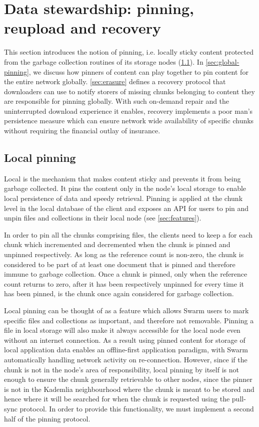 


\section{Data stewardship: pinning, reupload and recovery \statusyellow}\label{sec:reupload}

This section introduces the notion of pinning, i.e. locally sticky content protected from the garbage collection routines of its storage nodes (\ref{sec:pinning}). In \ref{sec:global-pinning}, we discuss how pinners of content can play together to pin content for the entire network globally. \ref{sec:erasure} defines a recovery protocol that downloaders can use to notify storers of missing chunks belonging to content they are responsible for pinning globally. With such on-demand repair and the uninterrupted download experience it enables, recovery implements a poor man's persistence measure which can ensure network wide availability of specific chunks without requiring the financial outlay of insurance.

\subsection{Local pinning \statusgreen}\label{sec:pinning}

Local  is the mechanism that makes content sticky and prevents it from being garbage collected. It pins the content only in the node's local storage to enable local persistence of data and speedy retrieval. Pinning is applied at the chunk level in the local database of the client and exposes an API for users to pin and unpin files and collections in their local node (see \ref{sec:features}).

In order to pin all the chunks comprising files, the clients need to keep a  for each chunk which incremented and decremented when the chunk is pinned and unpinned respectively. As long as the reference count is non-zero, the chunk is considered to be part of at least one document that is pinned and therefore immune to garbage collection. Once a chunk is pinned, only when the reference count returns to zero, after it has been respectively unpinned for every time it has been pinned, is the chunk once again considered for garbage collection.

Local pinning can be thought of as a feature which allows Swarm users to mark specific files and collections as important, and therefore not removable. Pinning a file in local storage will also make it always accessible for the local node even without an internet connection. As a result using pinned content for storage of local application data enables an offline-first application paradigm, with Swarm automatically handling network activity on re-connection. However, since if the chunk is not in the node's area of responsibility, local pinning by itself is not enough to ensure the chunk generally retrievable to other nodes, since the pinner is not in the Kademlia neighbourhood where the chunk is meant to be stored and hence where it will be searched for when the chunk is requested using the pull-sync protocol. In order to provide this functionality, we must implement a second half of the pinning protocol.

